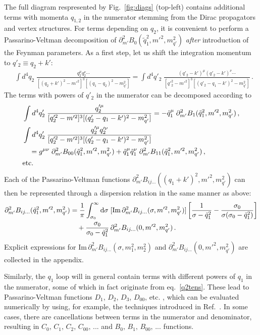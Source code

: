 \documentclass[12pt]{article}
\begin{document}
The full diagram respresented by Fig.~\ref{fig:diags} (top-left) contains
additional terms with momenta $q_{1,2}$ in the numerator stemming from the Dirac
propagators and vertex structures. For terms depending on $q_2$, it is
convenient to perform a Passarino-Veltman decomposition
\cite{Passarino:1978jh,denner} of
$\partial^2_{m'}B_0(\tilde{q}_1^2,m'^2,m_{q'}^2)$ \emph{after} introduction of the
Feynman parameters. As a first step, let us shift the integration momentum to
$q'_2 \equiv q_2 + k'$:
\begin{align}
&\int d^4q_2 \; \frac{q_2^\mu q_2^\nu \cdots}{[(q_2+k')^2-m'^2]^3[(q_1-q_2)^2-m_{q'}^2]}
= \int d^4q'_2 \; \frac{(q'_2-k')^\mu (q'_2-k')^\nu \cdots}
 {[q'^2_2-m'^2]^3[(q'_2-q_1-k')^2-m_{q'}^2]}\,.
\end{align}
The terms with powers of $q'_2$ in the numerator can be decomposed
according to
\begin{align}
&\int d^4q'_2 \; \frac{q'^\mu_2}{[q'^2_2-m'^2]^3[(q'_2-q_1-k')^2-m_{q'}^2]}
 = -\tilde{q}_1^\mu \; \partial^2_{m'}B_1(\tilde{q}_1^2,m'^2,m_{q'}^2)\,, \notag \\
&\int d^4q'_2 \; \frac{q'^\mu_2 q'^\nu_2}{[q'^2_2-m'^2]^3[(q'_2-q_1-k')^2-m_{q'}^2]}
 \label{q2tens} \\
 &\quad = g^{\mu\nu} \; \partial^2_{m'}B_{00}(\tilde{q}_1^2,m'^2,m_{q'}^2) +
 \tilde{q}_1^\mu\tilde{q}_1^\nu \; \partial^2_{m'}B_{11}(\tilde{q}_1^2,m'^2,m_{q'}^2)\,,
 \notag \\
&\text{etc.} \notag
\end{align}
Each of the Passarino-Veltman functions
$\partial^2_{m'}B_{ij...}((q_1+k')^2,m'^2,m_{q'}^2)$ can then be represented
through a dispersion relation in the same manner as above:
\begin{align}
\partial^2_{m'}B_{ij...}(\tilde{q}_1^2,m'^2,m_{q'}^2) &= \frac{1}{\pi}
 \int_{\sigma_0}^\infty {\rm d}\sigma \;
  [\text{Im} \, \partial^2_{m'}B_{ij...}(\sigma,m'^2,m_{q'}^2)]\,
  \biggl[\frac{1}{\sigma - \tilde{q}_1^2} - \frac{\sigma_0}{\sigma(\sigma_0 - \tilde{q}_1^2)}
 \biggr] \notag \\
 &\quad + \frac{\sigma_0}{\sigma_0 - \tilde{q}_1^2} \, 
 \partial^2_{m'}B_{ij...}(0,m'^2,m_{q'}^2)\,.
\end{align}
Explicit expressions for $\text{Im} \,
\partial^2_{m'}B_{ij...}(\sigma,m_1^2,m_2^2)$ and
$\partial^2_{m'}B_{ij...}(0,m'^2,m_{q'}^2)$ are collected in the appendix.

Similarly, the $q_1$ loop will in general contain terms with different powers of
$q_1$ in the numerator, some of which in fact originate from eq.~\eqref{q2tens}.
These lead to Passarino-Veltman functions $D_1$, $D_2$, $D_3$, $D_{00}$, etc.
\cite{Passarino:1978jh},
which can be evaluated numerically by using, for example, the techniques
introduced in Ref.~\cite{ff,vanOldenborgh:1990yc}. In some cases, there are cancellations between
terms in the numerator and denominator, resulting in
$C_0,\,C_1,\,C_2,\,C_{00},\,...$ and $B_0,\,B_1,\,B_{00},\,...$ functions.
\end{document}
